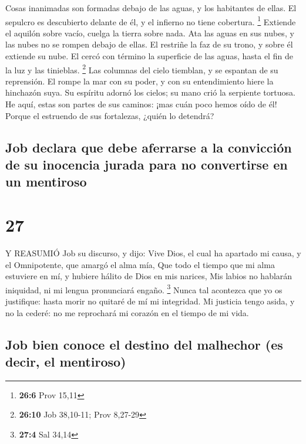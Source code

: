  Cosas inanimadas son formadas debajo de las aguas, y los
habitantes de ellas.  El sepulcro es descubierto delante de
él, y el infierno no tiene cobertura. \footnote{\textbf{26:6} Prov 15,11}
 Extiende el aquilón sobre vacío, cuelga la tierra sobre
nada.  Ata las aguas en sus nubes, y las nubes no se rompen
debajo de ellas.  El restriñe la faz de su trono, y sobre él
extiende su nube.  El cercó con término la superficie de
las aguas, hasta el fin de la luz y las tinieblas. \footnote{\textbf{26:10}
  Job 38,10-11; Prov 8,27-29}  Las columnas del cielo
tiemblan, y se espantan de su reprensión.  El rompe la mar
con su poder, y con su entendimiento hiere la hinchazón suya.
 Su espíritu adornó los cielos; su mano crió la serpiente
tortuosa.  He aquí, estas son partes de sus caminos: ¡mas
cuán poco hemos oído de él! Porque el estruendo de sus fortalezas,
¿quién lo detendrá?

\hypertarget{job-declara-que-debe-aferrarse-a-la-convicciuxf3n-de-su-inocencia-jurada-para-no-convertirse-en-un-mentiroso}{%
\subsection{Job declara que debe aferrarse a la convicción de su
inocencia jurada para no convertirse en un
mentiroso}\label{job-declara-que-debe-aferrarse-a-la-convicciuxf3n-de-su-inocencia-jurada-para-no-convertirse-en-un-mentiroso}}

\hypertarget{section-26}{%
\section{27}\label{section-26}}

 Y REASUMIÓ Job su discurso, y dijo:  Vive Dios,
el cual ha apartado mi causa, y el Omnipotente, que amargó el alma mía,
 Que todo el tiempo que mi alma estuviere en mí, y hubiere
hálito de Dios en mis narices,  Mis labios no hablarán
iniquidad, ni mi lengua pronunciará engaño. \footnote{\textbf{27:4} Sal
  34,14}  Nunca tal acontezca que yo os justifique: hasta
morir no quitaré de mí mi integridad.  Mi justicia tengo
asida, y no la cederé: no me reprochará mi corazón en el tiempo de mi
vida.

\hypertarget{job-bien-conoce-el-destino-del-malhechor-es-decir-el-mentiroso}{%
\subsection{Job bien conoce el destino del malhechor (es decir, el
mentiroso)}\label{job-bien-conoce-el-destino-del-malhechor-es-decir-el-mentiroso}}

